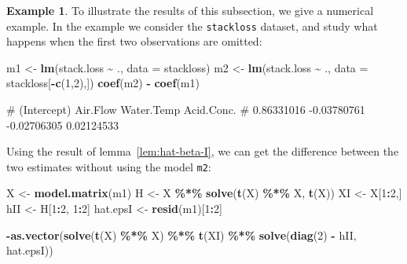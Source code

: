 \documentclass[
  a4paper,
]{article}
\newenvironment{Shaded}{\begin{snugshade}}{\end{snugshade}}
\newcommand{\AttributeTok}[1]{\textcolor[rgb]{0.13,0.29,0.53}{#1}}
\newcommand{\DecValTok}[1]{\textcolor[rgb]{0.00,0.00,0.81}{#1}}
\newcommand{\FunctionTok}[1]{\textcolor[rgb]{0.13,0.29,0.53}{\textbf{#1}}}
\newcommand{\NormalTok}[1]{#1}
\newcommand{\OtherTok}[1]{\textcolor[rgb]{0.56,0.35,0.01}{#1}}
\newcommand{\SpecialCharTok}[1]{\textcolor[rgb]{0.81,0.36,0.00}{\textbf{#1}}}
\theoremstyle{definition}
\theoremstyle{definition}
\newtheorem{example}{Example}[section]
\theoremstyle{definition}
\theoremstyle{definition}
\theoremstyle{remark}
\begin{document}
\begin{example}
To illustrate the results of this subsection, we give a numerical example.
In the example we consider the \texttt{stackloss} dataset, and study what happens
when the first two observations are omitted:

\begin{Shaded}
\begin{Highlighting}[]
\NormalTok{m1 }\OtherTok{\textless{}{-}} \FunctionTok{lm}\NormalTok{(stack.loss }\SpecialCharTok{\textasciitilde{}}\NormalTok{ ., }\AttributeTok{data =}\NormalTok{ stackloss)}
\NormalTok{m2 }\OtherTok{\textless{}{-}} \FunctionTok{lm}\NormalTok{(stack.loss }\SpecialCharTok{\textasciitilde{}}\NormalTok{ ., }\AttributeTok{data =}\NormalTok{ stackloss[}\SpecialCharTok{{-}}\FunctionTok{c}\NormalTok{(}\DecValTok{1}\NormalTok{,}\DecValTok{2}\NormalTok{),])}
\FunctionTok{coef}\NormalTok{(m2) }\SpecialCharTok{{-}} \FunctionTok{coef}\NormalTok{(m1)}
\end{Highlighting}
\end{Shaded}

\begin{Shaded}
\begin{Highlighting}[]
\NormalTok{\# (Intercept)    Air.Flow  Water.Temp  Acid.Conc. }
\NormalTok{\#  0.86331016 {-}0.03780761 {-}0.02706305  0.02124533}
\end{Highlighting}
\end{Shaded}

Using the result of lemma~\ref{lem:hat-beta-I}, we can get the difference
between the two estimates without using the model \texttt{m2}:

\begin{Shaded}
\begin{Highlighting}[]
\NormalTok{X }\OtherTok{\textless{}{-}} \FunctionTok{model.matrix}\NormalTok{(m1)}
\NormalTok{H }\OtherTok{\textless{}{-}}\NormalTok{ X }\SpecialCharTok{\%*\%} \FunctionTok{solve}\NormalTok{(}\FunctionTok{t}\NormalTok{(X) }\SpecialCharTok{\%*\%}\NormalTok{ X, }\FunctionTok{t}\NormalTok{(X))}
\NormalTok{XI }\OtherTok{\textless{}{-}}\NormalTok{ X[}\DecValTok{1}\SpecialCharTok{:}\DecValTok{2}\NormalTok{,]}
\NormalTok{hII }\OtherTok{\textless{}{-}}\NormalTok{ H[}\DecValTok{1}\SpecialCharTok{:}\DecValTok{2}\NormalTok{, }\DecValTok{1}\SpecialCharTok{:}\DecValTok{2}\NormalTok{]}
\NormalTok{hat.epsI }\OtherTok{\textless{}{-}} \FunctionTok{resid}\NormalTok{(m1)[}\DecValTok{1}\SpecialCharTok{:}\DecValTok{2}\NormalTok{]}

\SpecialCharTok{{-}}\FunctionTok{as.vector}\NormalTok{(}\FunctionTok{solve}\NormalTok{(}\FunctionTok{t}\NormalTok{(X) }\SpecialCharTok{\%*\%}\NormalTok{ X) }\SpecialCharTok{\%*\%} \FunctionTok{t}\NormalTok{(XI) }\SpecialCharTok{\%*\%} \FunctionTok{solve}\NormalTok{(}\FunctionTok{diag}\NormalTok{(}\DecValTok{2}\NormalTok{) }\SpecialCharTok{{-}}\NormalTok{ hII, hat.epsI))}
\end{Highlighting}
\end{Shaded}


\end{example}
\end{document}
